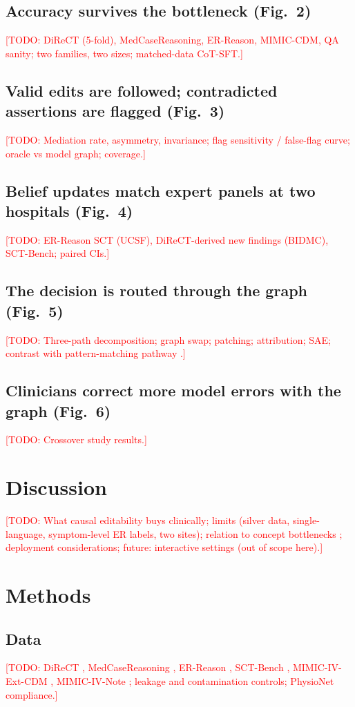 \documentclass[11pt]{article}
\newcommand{\todo}[1]{\textcolor{red}{[TODO: #1]}}
\begin{document}
\subsection*{Accuracy survives the bottleneck (Fig.~2)}
\todo{DiReCT (5-fold), MedCaseReasoning, ER-Reason, MIMIC-CDM, QA sanity; two families, two sizes; matched-data CoT-SFT.}
\subsection*{Valid edits are followed; contradicted assertions are flagged (Fig.~3)}
\todo{Mediation rate, asymmetry, invariance; flag sensitivity / false-flag curve; oracle vs model graph; coverage.}
\subsection*{Belief updates match expert panels at two hospitals (Fig.~4)}
\todo{ER-Reason SCT (UCSF), DiReCT-derived new findings (BIDMC), SCT-Bench; paired CIs.}
\subsection*{The decision is routed through the graph (Fig.~5)}
\todo{Three-path decomposition; graph swap; patching; attribution; SAE; contrast with pattern-matching pathway \cite{aaai2026mech}.}
\subsection*{Clinicians correct more model errors with the graph (Fig.~6)}
\todo{Crossover study results.}

\section*{Discussion}
\todo{What causal editability buys clinically; limits (silver data, single-language, symptom-level ER labels, two sites); relation to concept bottlenecks \cite{koh2020,rudin2019}; deployment considerations; future: interactive settings (out of scope here).}

\section*{Methods}
\subsection*{Data}
\todo{DiReCT \cite{direct2024}, MedCaseReasoning \cite{medcasereasoning2025}, ER-Reason \cite{erreason2025}, SCT-Bench \cite{mccoy2025sct}, MIMIC-IV-Ext-CDM \cite{hager2024}, MIMIC-IV-Note \cite{mimiciv2023}; leakage and contamination controls; PhysioNet compliance.}
\end{document}
